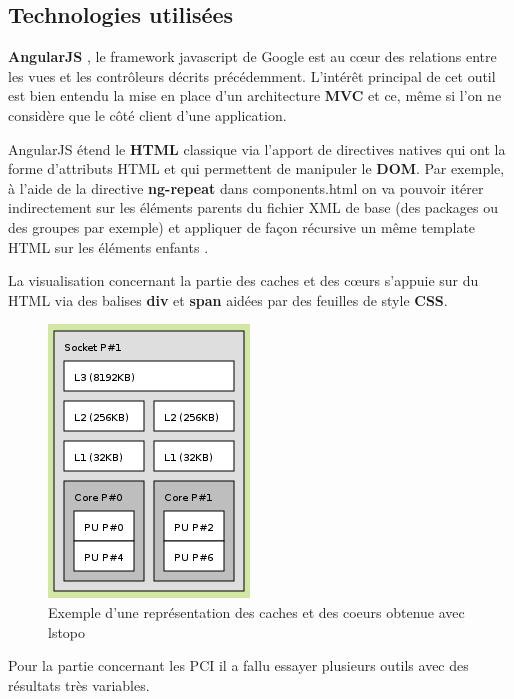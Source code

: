 \documentclass [a4paper,11pt]{article}
\begin{document}
\subsection{Technologies utilisées}
\textbf{AngularJS} \cite{angular}, le framework javascript de Google est au cœur des relations entre les vues et les contrôleurs décrits précédemment. L’intérêt principal de cet outil est bien entendu la mise en place d’un architecture \textbf{MVC} et ce, même si l’on ne considère que le côté client d’une application.
\newline

AngularJS étend le \textbf{HTML} classique via l’apport de directives natives qui ont la forme d’attributs HTML et qui permettent de manipuler le \textbf{DOM}. Par exemple, à l’aide de la directive \textbf{ng-repeat} dans components.html on va pouvoir itérer indirectement sur les éléments parents du fichier XML de base (des packages ou des groupes par exemple) et appliquer de façon récursive un même template HTML sur les éléments enfants \cite{Foster14}.
\newline

La visualisation concernant la partie des caches et des cœurs s’appuie sur du HTML via des balises \textbf{div} et \textbf{span} aidées par des feuilles de style \textbf{CSS}.

\begin{figure}[H]
\centering
\includegraphics[scale=0.5]{img/caches.png}
\caption{Exemple d'une représentation des caches et des coeurs obtenue avec lstopo}
\end{figure}

Pour la partie concernant les PCI il a fallu essayer plusieurs outils avec des résultats très variables. 
\end{document}
